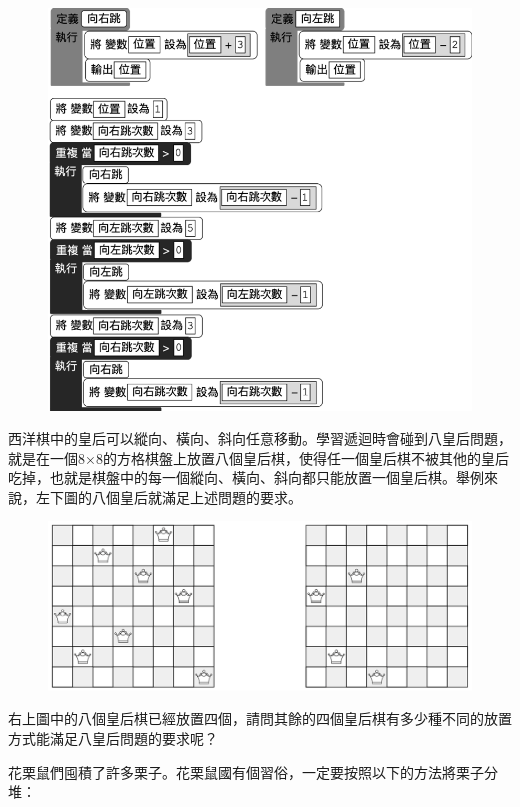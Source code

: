 \documentclass[a4paper, 12pt, addpoints]{exam}
\begin{document}
\begin{questions}
    \begin{figure}[H]
        \centerline{\includegraphics{fig/frog.png}}
    \end{figure}

    \question[4]
    西洋棋中的皇后可以縱向、橫向、斜向任意移動。學習遞迴時會碰到八皇后問題，就是在一個8×8的方格棋盤上放置八個皇后棋，使得任一個皇后棋不被其他的皇后吃掉，也就是棋盤中的每一個縱向、橫向、斜向都只能放置一個皇后棋。舉例來說，左下圖的八個皇后就滿足上述問題的要求。

    \begin{figure}[H]
        \centerline{\includegraphics{fig/chess.png}}
    \end{figure}
    右上圖中的八個皇后棋已經放置四個，請問其餘的四個皇后棋有多少種不同的放置方式能滿足八皇后問題的要求呢？


    \question[4]
    花栗鼠們囤積了許多栗子。花栗鼠國有個習俗，一定要按照以下的方法將栗子分堆：


\end{questions}
\end{document}
